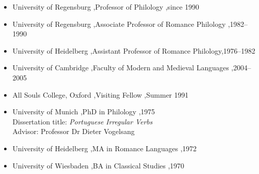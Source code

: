 \documentclass[letterpaper,10pt]{article}
\begin{document}


\begin{itemize}
\item University of Regensburg \sep Professor of Philology \sep since 1990
\item University of Regensburg \sep Associate Professor of Romance Philology \sep 1982--1990
\item University of Heidelberg \sep Assistant Professor of Romance Philology\sep 1976--1982
\end{itemize}


\begin{itemize}
\item University of Cambridge \sep Faculty of Modern and Medieval Languages \sep 2004--2005
\item All Souls College, Oxford \sep Visiting Fellow \sep Summer 1991
\end{itemize}


\begin{itemize}
\item University of Munich \sep PhD in Philology \sep 1975\\
Dissertation title: \textit{Portuguese Irregular Verbs}\\
Advisor: Professor Dr Dieter Vogelsang
\item University of Heidelberg \sep MA in Romance Languages \sep 1972
\item University of Wiesbaden \sep BA in Classical Studies \sep 1970
\end{itemize}

\end{document}
